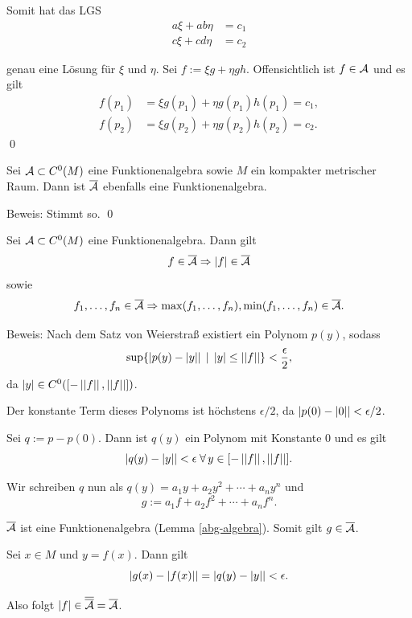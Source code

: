 \begin{frame}
    Somit hat das LGS 
    \begin{align*}
        a \xi + ab \eta &= c_1 \\
        c \xi + cd \eta &= c_2
    \end{align*}

    genau eine Lösung für \( \xi \) und \( \eta \). 
    \pause
    Sei \( f := \xi g + \eta g h \). \pause 
    Offensichtlich ist \( f \in \mathcal{A} \) \pause 
    und es gilt 
    \begin{align*}
        f(p_1) &= \xi g(p_1) + \eta g(p_1) h(p_1) = c_1, \\
        f(p_2) &= \xi g(p_2) + \eta g(p_2) h(p_2) = c_2.
    \end{align*}
    \qed
\end{frame}

\begin{frame}
    \begin{lem}\label{abg-algebra}
        Sei \( \mathcal{A} \subset C^0(M) \) eine Funktionenalgebra 
        sowie \(M\) ein kompakter metrischer Raum.
        Dann ist \( \overline{\mathcal{A}} \) ebenfalls eine Funktionenalgebra.
    \end{lem} \pause
    Beweis: \pause 
    Stimmt so. \qed
\end{frame}

\begin{frame}
    \begin{lem}\label{betrag-in-algebra}
        Sei \( \mathcal{A} \subset C^0(M) \) eine Funktionenalgebra. Dann gilt 
        \[ f \in \overline{\mathcal{A}} \Rightarrow \left|f\right| \in \overline{\mathcal{A}} \]
        sowie 
        \[ f_1, \ldots, f_n \in \overline{\mathcal{A}} \Rightarrow \max(f_1,\ldots, f_n), \min(f_1,\ldots, f_n) \in \overline{\mathcal{A}}. \]
    \end{lem} \pause
    Beweis:
    Nach dem Satz von Weierstraß existiert ein Polynom 
    \( p(y) \), sodass 
    \[ \sup \{ \left| p(y) - \left|y\right| \right| 
    \;|\; \left|y\right| \leq \left|\left|f\right|\right| \} < \frac{\epsilon}{2}, \]
    da \( \left|y\right| \in C^0([-\left|\left|f\right|\right|, \left|\left|f\right|\right|]) \). 
    \pause

    Der konstante Term dieses Polynoms ist höchstens \( \epsilon / 2 \), 
    da \( \left| p(0) - \left|0\right| \right| < \epsilon/2 \).
\end{frame}

\begin{frame}
    Sei \( q := p - p(0) \). Dann ist \( q(y) \) ein 
    Polynom mit Konstante \(0\) und es gilt 
    \[ \abs{ q(y) - \abs{y} } < \epsilon 
    \;\forall y \in [-\norm{f}, \norm{f}]. \]
    \pause

    Wir schreiben \( q \) nun als 
    \( q(y) = a_1 y + a_2 y^2 + \cdots + a_n y^n \) und 
    \[ g := a_1 f + a_2 f^2 + \cdots + a_n f^n. \]
    \pause

    \( \overline{\mathcal{A}} \) ist eine Funktionenalgebra (Lemma \ref{abg-algebra}).
    Somit gilt \( g \in \overline{\mathcal{A}} \). 
    \pause

    Sei \( x\in M \) und \( y = f(x) \). Dann gilt 
    \[ \left| g(x) - \left|f(x)\right| \right| = \left| q(y) - \left|y\right| \right| < \epsilon. \]
    \pause
    
    Also folgt \( \left|f\right| \in \overline{\overline{\mathcal{A}}} = \overline{\mathcal{A}} \). 
\end{frame}


